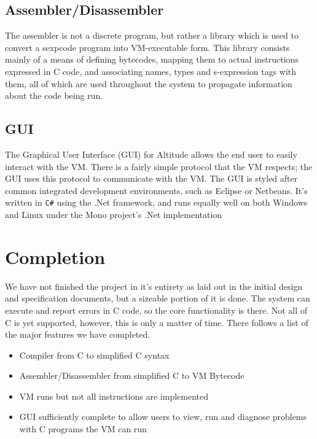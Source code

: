 \documentclass[10pt,a4paper]{report}
\begin{document}
\subsection{Assembler/Disassembler}
The assembler is not a discrete program, but rather a library which is used to convert a sexpcode program into VM-executable form. This library consists mainly of a means of defining bytecodes, mapping them to actual instructions expressed in C code, and associating names, types and s-expression tags with them, all of which are used throughout the system to propagate information about the code being run.

\subsection{GUI}
The Graphical User Interface (GUI) for Altitude allows the end user to easily interact with the VM. There is a fairly simple protocol that the VM respects; the GUI uses this protocol to communicate with the VM. The GUI is styled after common integrated development environments, such as Eclipse or Netbeans. It's written in \lstinline{C#} using the .Net framework, and runs equally well on both Windows and Linux under the Mono project's .Net implementation

\section{Completion}
We have not finished the project in it's entirety as laid out in the initial design and specification documents, but a sizeable portion of it is done. The system can execute and report errors in C code, so the core functionality is there. Not all of C is yet supported, however, this is only a matter of time. There follows a list of the major features we have completed.
\begin{itemize}
\item Compiler from C to simplified C syntax
\item Assembler/Disassembler from simplified C to VM Bytecode
\item VM runs but not all instructions are implemented
\item GUI sufficiently complete to allow users to view, run and diagnose problems with C programs the VM can run
\end{itemize}
\end{document}
